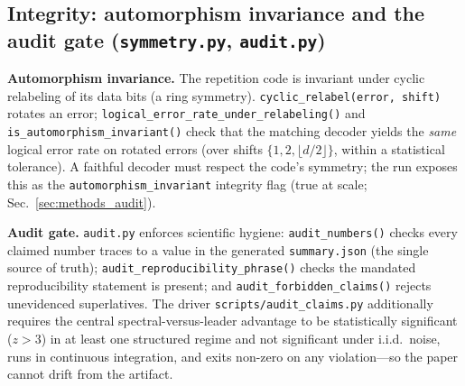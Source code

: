 \documentclass[reprint,aps,prxquantum,amsmath,amssymb,floatfix,nofootinbib,longbibliography]{revtex4-2}
\theoremstyle{definition}
\theoremstyle{remark}
\theoremstyle{plain}
\begin{document}
\subsection{Integrity: automorphism invariance and the audit gate (\texttt{symmetry.py}, \texttt{audit.py})}
\label{sec:si_integrity}
\textbf{Automorphism invariance.} The repetition code is invariant under cyclic relabeling of its data bits (a ring symmetry). \texttt{cyclic\_relabel(error, shift)} rotates an error; \texttt{logical\_error\_rate\_under\_relabeling()} and \texttt{is\_automorphism\_invariant()} check that the matching decoder yields the \emph{same} logical error rate on rotated errors (over shifts $\{1,2,\lfloor d/2\rfloor\}$, within a statistical tolerance). A faithful decoder must respect the code's symmetry; the run exposes this as the \texttt{automorphism\_invariant} integrity flag (true at scale; Sec.~\ref{sec:methods_audit}).

\textbf{Audit gate.} \texttt{audit.py} enforces scientific hygiene: \texttt{audit\_numbers()} checks every claimed number traces to a value in the generated \texttt{summary.json} (the single source of truth); \texttt{audit\_reproducibility\_phrase()} checks the mandated reproducibility statement is present; and \texttt{audit\_forbidden\_claims()} rejects unevidenced superlatives. The driver \texttt{scripts/audit\_claims.py} additionally requires the central spectral-versus-leader advantage to be statistically significant ($z>3$) in at least one structured regime and not significant under i.i.d.\ noise, runs in continuous integration, and exits non-zero on any violation---so the paper cannot drift from the artifact.
\end{document}

